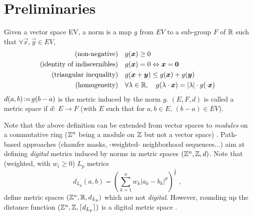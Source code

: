 \documentclass{llncs}
\begin{document}
\section{Preliminaries}
\label{sec:preliminaries}
\begin{definition}
  \label{def:norm}
  Given a vector space EV, a norm is a map $g$ from  $EV$ to a sub-group
  $F$ of ${\mathbb{R}}$ such that $\forall \vec{x},\vec{y}\in EV$,
  \begin{align}
    (\text{non-negative})\quad & g(\vec{x})\geq 0\\
    (\text{identity of indiscernibles}) \quad&  g(\vec{x})= 0
    \Leftrightarrow \vec{x}=\vec{0}\\
    (\text{triangular inequality})\quad &   g(\vec{x}+\vec{y}) \leq
    g(\vec{x}) + g(\vec{y})\\
    (\text{homogeneity})\quad &  \forall \lambda\in\R, \quad
    g(\lambda\cdot\vec{x}) = |\lambda|\cdot g(\cdot\vec{x})
  \end{align}
$d(a,b) \!\mathrel{\mathop:}=\! g(b-a)$ is the metric induced by the
  norm $g$.  $(E, F, d)$ is called a  metric space if $d:~E\rightarrow
  F$ (with $E$ such that for $a,b\in E$, $(b-a)\in EV$).
\end{definition}
Note that the above definition can be extended from vector spaces to
\emph{modules} on a commutative ring (${\mathbb{Z}}^n$ being a module on ${\mathbb{Z}}$
but not a vector space) \cite{Thiel_hdr}. Path-based approaches
(chamfer masks, -weighted- neighborhood sequences...)  aim at defining
\emph{digital}
metrics induced by norms in metric spaces $({\mathbb{Z}}^n, {\mathbb{Z}} , d)$.  Note that
(weighted, with $w_i\geq 0$) $L_p$ metrics
\begin{equation}
    d_{L_p} (a,b) = \left ( \sum_{k=1}^n w_k|a_k-b_k |^p \right )^{\frac{1}{p}}\;,
  \end{equation}
define metric spaces $({\mathbb{Z}}^n, {\mathbb{R}} , d_{L_p})$ which are not
\emph{digital}. However, rounding up the \sloppy distance function
$({\mathbb{Z}}^n,{\mathbb{Z}}, \lceil d_{L_p}\rceil)$ is a digital metric space
\cite{klette_book}.
\end{document}
